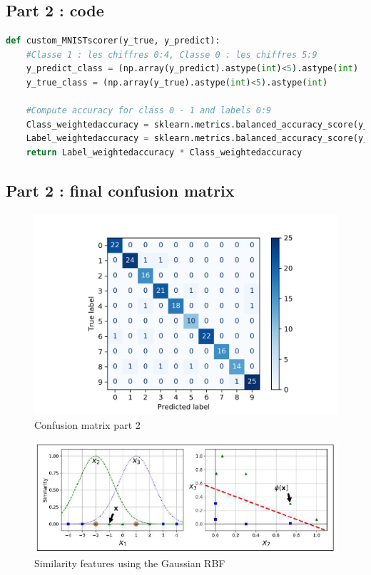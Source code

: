\subsection{Part 2 : code}
\label{appendix:code_part2}
\begin{lstlisting}[language=Python]
def custom_MNISTscorer(y_true, y_predict):
    #Classe 1 : les chiffres 0:4, Classe 0 : les chiffres 5:9
    y_predict_class = (np.array(y_predict).astype(int)<5).astype(int)
    y_true_class = (np.array(y_true).astype(int)<5).astype(int)
    
    #Compute accuracy for class 0 - 1 and labels 0:9
    Class_weightedaccuracy = sklearn.metrics.balanced_accuracy_score(y_true_class, y_predict_class)
    Label_weightedaccuracy = sklearn.metrics.balanced_accuracy_score(y_true, y_predict)
    return Label_weightedaccuracy * Class_weightedaccuracy
\end{lstlisting}

\subsection{Part 2 : final confusion matrix}
\begin{figure}[h]
	\centering 
	\includegraphics[scale=0.7]{Pics/part2confusion_mat}
	\caption{Confusion matrix part 2}
	\label{fig:confusion}
\end{figure} 

\begin{figure}[h]
	\centering 
	\includegraphics[scale=0.7]{Pics/RBF}
	\caption{Similarity features using the Gaussian RBF}
\end{figure} 
